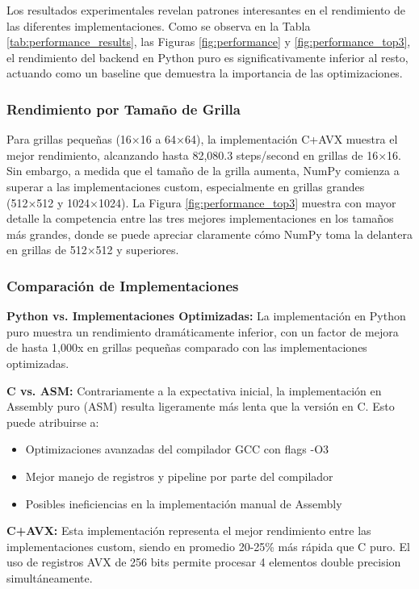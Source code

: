 \documentclass[a4paper]{article}
\begin{document}
Los resultados experimentales revelan patrones interesantes en el rendimiento de las diferentes implementaciones. Como se observa en la Tabla \ref{tab:performance_results}, las Figuras \ref{fig:performance} y \ref{fig:performance_top3}, el rendimiento del backend en Python puro es significativamente inferior al resto, actuando como un baseline que demuestra la importancia de las optimizaciones.

\subsubsection{Rendimiento por Tamaño de Grilla}

Para grillas pequeñas (16×16 a 64×64), la implementación C+AVX muestra el mejor rendimiento, alcanzando hasta 82,080.3 steps/second en grillas de 16×16. Sin embargo, a medida que el tamaño de la grilla aumenta, NumPy comienza a superar a las implementaciones custom, especialmente en grillas grandes (512×512 y 1024×1024). La Figura \ref{fig:performance_top3} muestra con mayor detalle la competencia entre las tres mejores implementaciones en los tamaños más grandes, donde se puede apreciar claramente cómo NumPy toma la delantera en grillas de 512×512 y superiores.

\subsubsection{Comparación de Implementaciones}

\textbf{Python vs. Implementaciones Optimizadas:} La implementación en Python puro muestra un rendimiento dramáticamente inferior, con un factor de mejora de hasta 1,000x en grillas pequeñas comparado con las implementaciones optimizadas.

\textbf{C vs. ASM:} Contrariamente a la expectativa inicial, la implementación en Assembly puro (ASM) resulta ligeramente más lenta que la versión en C. Esto puede atribuirse a:
\begin{itemize}
    \item Optimizaciones avanzadas del compilador GCC con flags -O3
    \item Mejor manejo de registros y pipeline por parte del compilador
    \item Posibles ineficiencias en la implementación manual de Assembly
\end{itemize}

\textbf{C+AVX:} Esta implementación representa el mejor rendimiento entre las implementaciones custom, siendo en promedio 20-25\% más rápida que C puro. El uso de registros AVX de 256 bits permite procesar 4 elementos double precision simultáneamente.
\end{document}
